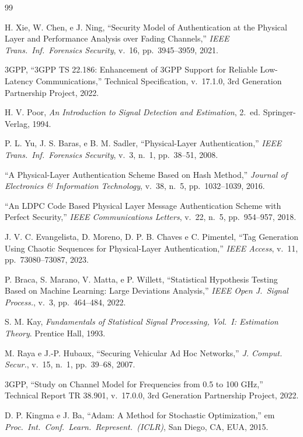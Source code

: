 \documentclass{sbrt}
\begin{document}
\begin{thebibliography}{99}

H. Xie, W. Chen, e J. Ning, ``Security Model of Authentication at the Physical Layer and Performance Analysis over Fading Channels,'' \textit{IEEE Trans.\ Inf.\ Forensics Security}, v.~16, pp.~3945--3959, 2021.

3GPP, ``3GPP TS 22.186: Enhancement of 3GPP Support for Reliable Low-Latency Communications,'' Technical Specification, v.~17.1.0, 3rd Generation Partnership Project, 2022.

H. V. Poor, \textit{An Introduction to Signal Detection and Estimation}, 2.~ed. Springer-Verlag, 1994.

P. L. Yu, J. S. Baras, e B. M. Sadler, ``Physical-Layer Authentication,'' \textit{IEEE Trans.\ Inf.\ Forensics Security}, v.~3, n.~1, pp.~38--51, 2008.

``A Physical-Layer Authentication Scheme Based on Hash Method,'' \textit{Journal of Electronics \& Information Technology}, v.~38, n.~5, pp.~1032--1039, 2016.

``An LDPC Code Based Physical Layer Message Authentication Scheme with Perfect Security,'' \textit{IEEE Communications Letters}, v.~22, n.~5, pp.~954--957, 2018.

J. V. C. Evangelista, D. Moreno, D. P. B. Chaves e C. Pimentel, ``Tag Generation Using Chaotic Sequences for Physical-Layer Authentication,'' \textit{IEEE Access}, v.~11, pp.~73080--73087, 2023.

P. Braca, S. Marano, V. Matta, e P. Willett, ``Statistical Hypothesis Testing Based on Machine Learning: Large Deviations Analysis,'' \textit{IEEE Open J.\ Signal Process.}, v.~3, pp.~464--484, 2022.

S. M. Kay, \textit{Fundamentals of Statistical Signal Processing, Vol.~I: Estimation Theory}. Prentice Hall, 1993.

M. Raya e J.-P. Hubaux, ``Securing Vehicular Ad Hoc Networks,'' \textit{J. Comput. Secur.}, v.~15, n.~1, pp.~39--68, 2007.

3GPP, ``Study on Channel Model for Frequencies from 0.5 to 100 GHz,'' Technical Report TR 38.901, v.~17.0.0, 3rd Generation Partnership Project, 2022.

D. P. Kingma e J. Ba, ``Adam: A Method for Stochastic Optimization,'' em \textit{Proc.\ Int.\ Conf.\ Learn.\ Represent.\ (ICLR)}, San Diego, CA, EUA, 2015.


\end{thebibliography}
\end{document}
